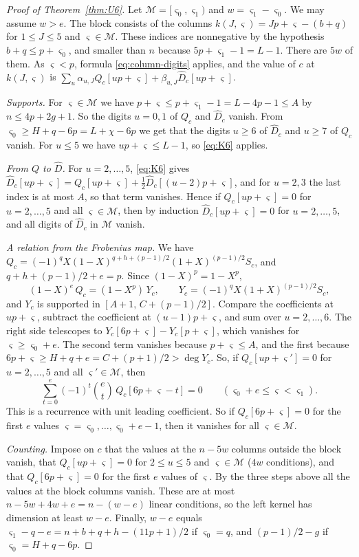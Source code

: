 \begin{proof}[Proof of Theorem~\ref{thm:U6}]
Let $\mathcal M=[\varsigma_0,\varsigma_1)$ and $w=\varsigma_1-\varsigma_0$. We may assume $w>e$. The block consists of the columns
$k(J,\varsigma)=Jp+\varsigma-(b+q)$ for $1\le J\le5$ and $\varsigma\in \mathcal M$. These indices are nonnegative by the hypothesis
$b+q\le p+\varsigma_0$, and smaller than $n$ because $5p+\varsigma_1-1=L-1$. There are $5w$ of them. As $\varsigma<p$, formula
\eqref{eq:column-digits} applies, and the value of $c$ at $k(J,\varsigma)$ is
$\sum_u\alpha_{u,J}Q_c[up+\varsigma]+\beta_{u,J}\widehat D_c[up+\varsigma]$.

\emph{Supports.} For $\varsigma\in \mathcal M$ we have $p+\varsigma\le p+\varsigma_1-1=L-4p-1\le A$ by $n\le4p+2g+1$. So the digits $u=0,1$
of $Q_c$ and $\widehat D_c$ vanish. From $\varsigma_0\ge H+q-6p=L+\chi-6p$ we get that the digits $u\ge6$ of
$\widehat D_c$ and $u\ge7$ of $Q_c$ vanish. For $u\le5$ we have $up+\varsigma\le L-1$, so \eqref{eq:K6} applies.

\emph{From $Q$ to $\widehat D$.} For $u=2,\dots,5$, \eqref{eq:K6} gives
$\widehat D_c[up+\varsigma]=Q_c[up+\varsigma]+\tfrac12\widehat D_c[(u-2)p+\varsigma]$, and for $u=2,3$ the last index is at most $A$,
so that term vanishes. Hence if $Q_c[up+\varsigma]=0$ for $u=2,\dots,5$ and all $\varsigma\in \mathcal M$, then by induction
$\widehat D_c[up+\varsigma]=0$ for $u=2,\dots,5$, and all digits of $\widehat D_c$ in $\mathcal M$ vanish.

\emph{A relation from the Frobenius map.} We have
$Q_c=(-1)^qX(1-X)^{q+h+(p-1)/2}(1+X)^{(p-1)/2}S_c$, and $q+h+(p-1)/2+e=p$. Since $(1-X)^p=1-X^p$,
\[
 (1-X)^e\,Q_c=(1-X^p)\,Y_c,\qquad Y_c=(-1)^qX(1+X)^{(p-1)/2}S_c,
\]
and $Y_c$ is supported in $[A+1,\,C+(p-1)/2]$. Compare the coefficients at $up+\varsigma$, subtract the
coefficient at $(u-1)p+\varsigma$, and sum over $u=2,\dots,6$. The right side telescopes to
$Y_c[6p+\varsigma]-Y_c[p+\varsigma]$, which vanishes for $\varsigma\ge\varsigma_0+e$. The second term vanishes because $p+\varsigma\le A$,
and the first because $6p+\varsigma\ge H+q+e=C+(p+1)/2>\deg Y_c$. So, if $Q_c[up+\varsigma']=0$ for $u=2,\dots,5$ and all
$\varsigma'\in \mathcal M$, then
\[
 \sum_{t=0}^e(-1)^t\binom et\,Q_c[6p+\varsigma-t]=0\qquad(\varsigma_0+e\le\varsigma<\varsigma_1).
\]
This is a recurrence with unit leading coefficient. So if $Q_c[6p+\varsigma]=0$ for the first $e$ values
$\varsigma=\varsigma_0,\dots,\varsigma_0+e-1$, then it vanishes for all $\varsigma\in \mathcal M$.

\emph{Counting.} Impose on $c$ that the values at the $n-5w$ columns outside the block vanish, that
$Q_c[up+\varsigma]=0$ for $2\le u\le5$ and $\varsigma\in \mathcal M$ ($4w$ conditions), and that $Q_c[6p+\varsigma]=0$ for the first $e$
values of $\varsigma$. By the three steps above all the values at the block columns vanish. These are at most
$n-5w+4w+e=n-(w-e)$ linear conditions, so the left kernel has dimension at least $w-e$. Finally, $w-e$
equals $\varsigma_1-q-e=n+b+q+h-(11p+1)/2$ if $\varsigma_0=q$, and $(p-1)/2-g$ if $\varsigma_0=H+q-6p$.
\end{proof}

